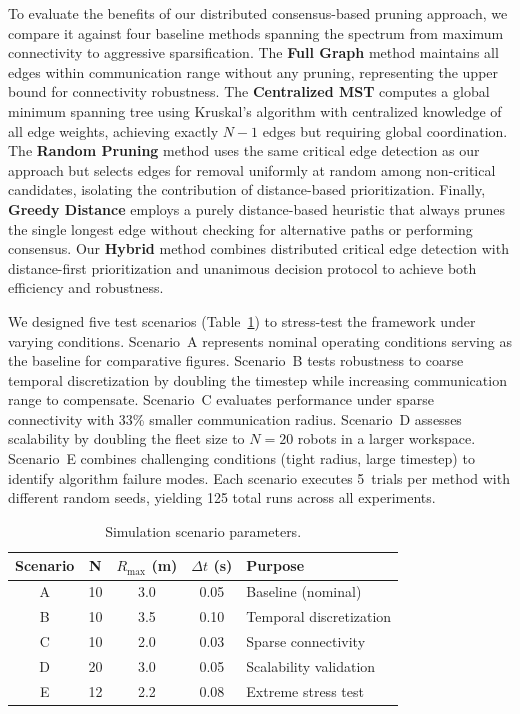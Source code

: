 \documentclass[conference]{IEEEconf}
\theoremstyle{plain}
\begin{document}
To evaluate the benefits of our distributed consensus-based pruning approach, we compare it against four baseline methods spanning the spectrum from maximum connectivity to aggressive sparsification. The \textbf{Full Graph} method maintains all edges within communication range without any pruning, representing the upper bound for connectivity robustness. The \textbf{Centralized MST} computes a global minimum spanning tree using Kruskal's algorithm with centralized knowledge of all edge weights, achieving exactly $N-1$ edges but requiring global coordination. The \textbf{Random Pruning} method uses the same critical edge detection as our approach but selects edges for removal uniformly at random among non-critical candidates, isolating the contribution of distance-based prioritization. Finally, \textbf{Greedy Distance} employs a purely distance-based heuristic that always prunes the single longest edge without checking for alternative paths or performing consensus. Our \textbf{Hybrid} method combines distributed critical edge detection with distance-first prioritization and unanimous decision protocol to achieve both efficiency and robustness.

We designed five test scenarios (Table~\ref{tab:scenarios}) to stress-test the framework under varying conditions. Scenario~A represents nominal operating conditions serving as the baseline for comparative figures. Scenario~B tests robustness to coarse temporal discretization by doubling the timestep while increasing communication range to compensate. Scenario~C evaluates performance under sparse connectivity with 33\% smaller communication radius. Scenario~D assesses scalability by doubling the fleet size to $N=20$ robots in a larger workspace. Scenario~E combines challenging conditions (tight radius, large timestep) to identify algorithm failure modes. Each scenario executes 5~trials per method with different random seeds, yielding 125 total runs across all experiments.

\begin{table}[t]
\centering
\caption{Simulation scenario parameters.}
\label{tab:scenarios}
\begin{tabular}{ccccp{}}
\hline
\textbf{Scenario} & \textbf{N} & \textbf{$R_{\max}$ (m)} & \textbf{$\Delta t$ (s)} & \textbf{Purpose} \\
\hline
A & 10 & 3.0 & 0.05 & Baseline (nominal) \\
B & 10 & 3.5 & 0.10 & Temporal discretization \\
C & 10 & 2.0 & 0.03 & Sparse connectivity \\
D & 20 & 3.0 & 0.05 & Scalability validation \\
E & 12 & 2.2 & 0.08 & Extreme stress test \\
\hline
\end{tabular}
\end{table}
\end{document}
